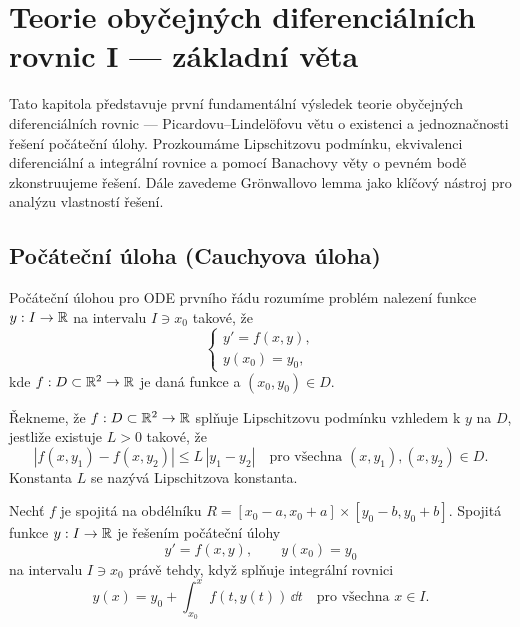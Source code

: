 \section{Teorie obyčejných diferenciálních rovnic I — základní věta}
\label{sec:ODE-zakladni-veta}

Tato kapitola představuje první fundamentální výsledek teorie obyčejných diferenciálních rovnic — Picardovu–Lindel\"ofovu větu o existenci a jednoznačnosti řešení počáteční úlohy. 
Prozkoumáme Lipschitzovu podmínku, ekvivalenci diferenciální a integrální rovnice a pomocí Banachovy věty o pevném bodě zkonstruujeme řešení. 
Dále zavedeme Gr\"onwallovo lemma jako klíčový nástroj pro analýzu vlastností řešení.

\spc

\subsection{Počáteční úloha (Cauchyova úloha)}
\label{sec:pocatecni-uloha}

\begin{definition}
\label{def:pocatecni-uloha}
Počáteční úlohou pro ODE prvního řádu rozumíme problém nalezení funkce $y:I\to\mathbb{R}$ na intervalu $I\ni x_0$ takové, že
\[
\begin{cases}
y' = f(x,y),\\
y(x_0)=y_0,
\end{cases}
\]
kde $f:D\subset\mathbb{R}^2\to\mathbb{R}$ je daná funkce a $(x_0,y_0)\in D$.
\end{definition}

\begin{definition}
\label{def:lipschitz}
Řekneme, že $f:D\subset\mathbb{R}^2\to\mathbb{R}$ splňuje Lipschitzovu podmínku vzhledem k $y$ na $D$, jestliže existuje $L>0$ takové, že
\[
|f(x,y_1)-f(x,y_2)| \le L\,|y_1-y_2| \quad \text{pro všechna } (x,y_1),(x,y_2)\in D.
\]
Konstanta $L$ se nazývá Lipschitzova konstanta.
\end{definition}

\begin{theorem}
\label{vet:ekvivalence-integralni}
Nechť $f$ je spojitá na obdélníku $R=[x_0-a,x_0+a]\times[y_0-b,y_0+b]$. 
Spojitá funkce $y:I\to\mathbb{R}$ je řešením počáteční úlohy
\[
y'=f(x,y),\qquad y(x_0)=y_0
\]
na intervalu $I\ni x_0$ právě tehdy, když splňuje integrální rovnici
\[
y(x)=y_0+\int_{x_0}^{x} f(t,y(t))\,\dd t \quad \text{pro všechna } x\in I.
\]
\end{theorem}

